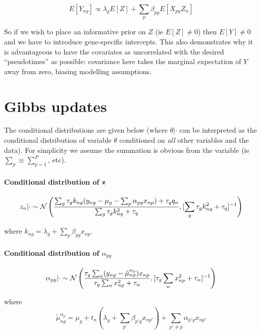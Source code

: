 \begin{equation}
E[Y_{ng}] \propto \lambda_g E[Z] + \sum_p \beta_{pg} E[X_{pg}Z_n]
\end{equation}

So if we wish to place an informative prior on $Z$ (ie $E[Z] \neq 0$) then $E[Y] \neq 0$ and we have to introduce gene-specific intercepts. This also demonstrates why it is advantageous to have the covariates as uncorrelated with the desired ``pseudotimes'' as possible: covariance here takes the marginal expectation of $Y$ away from zero, biasing modelling assumptions.


\section{Gibbs updates} \label{app:clvm_gibbs}


The conditional distributions are given below (where $\theta | \cdot$ can be interpreted as the conditional distribution of variable $\theta$ conditioned on \emph{all} other variables and the data). For simplicity we assume the summation is obvious from the variable (ie $\sum_p \equiv \sum_{p=1}^P$, etc).



\paragraph{Conditional distribution of ${\bf z}$}
\begin{equation}
z_n | \cdot \sim \mathcal{N} \left( \frac{ \sum_g \tau_g k_{ng} (y_{ng} - \mu_{g} - \sum_p \alpha_{pg}x_{np}) + \tau_q q_n}{\sum_g \tau_g k_{ng}^2 + \tau_q}, [\sum_g \tau_g k_{ng}^2 + \tau_q]^{-1} \right)
\end{equation}

where $k_{ng} = \lambda_g + \sum_p \beta_{pg} x_{np}$.

\paragraph{Conditional distribution of $\alpha_{pg}$}

\begin{equation}
\alpha_{pg} | \cdot \sim \mathcal{N} \left( \frac{
\tau_g \sum_n (y_{ng} - \tilde{\mu}_{ng}^{\alpha_p})x_{np}
}{\tau_g \sum_n x_{np}^2 + \tau_\alpha},
[\tau_g \sum_n x_{np}^2 + \tau_\alpha]^{-1} \right)
\end{equation}

where
\begin{equation}
\tilde{\mu}_{ng}^{\alpha_p} = \mu_g + t_n(\lambda_g + \sum_{p'} \beta_{p'g} x_{np'}) + \sum_{p' \neq p} \alpha_{p'g} x_{np'}
\end{equation}


